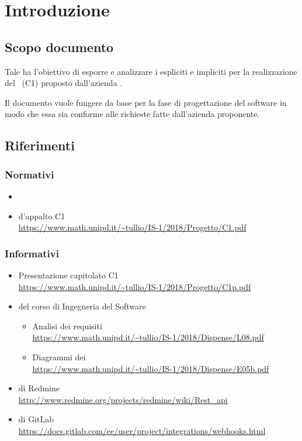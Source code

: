 \newpage
\section{Introduzione}

	\subsection{Scopo documento}
	Tale  ha l'obiettivo di esporre e analizzare i  espliciti e impliciti per la realizzazione del  \progetto\ (C1) proposto dall'azienda \II.

	Il documento vuole fungere da base per la fase di progettazione del software in modo che essa sia conforme alle richieste fatte dall'azienda proponente.

    

    

	\subsection{Riferimenti}

	\subsubsection{Normativi}
	\begin{itemize}
		\item \Doc{\NdPv}
		\item {} d'appalto C1\\
		\url{https://www.math.unipd.it/~tullio/IS-1/2018/Progetto/C1.pdf}
	\end{itemize}

	\subsubsection{Informativi} \label{sec:RiferimentiInformativi}
	\begin{itemize}
		\item Presentazione capitolato C1\\
		\url{https://www.math.unipd.it/~tullio/IS-1/2018/Progetto/C1p.pdf}
		\item {} del corso di Ingegneria del Software
		\begin{itemize}
			\item Analisi dei requisiti\\
			\url{https://www.math.unipd.it/~tullio/IS-1/2018/Dispense/L08.pdf}
			\item Diagrammi dei \\
			\url{https://www.math.unipd.it/~tullio/IS-1/2018/Dispense/E05b.pdf}
		\end{itemize}
		\item {} di Redmine\\
		\url{http://www.redmine.org/projects/redmine/wiki/Rest_api}
		\item {} di GitLab\\
		\url{https://docs.gitlab.com/ee/user/project/integrations/webhooks.html}
	\end{itemize}
